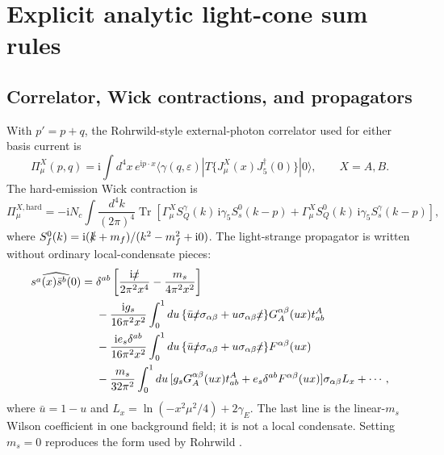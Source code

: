 \documentclass[11pt]{article}
\newcommand{\ii}{\mathrm{i}}
\begin{document}
\appendix

\section{Explicit analytic light-cone sum rules}
\label{app:lcsr}

\subsection{Correlator, Wick contractions, and propagators}

With $p'=p+q$, the Rohrwild-style external-photon correlator used for either
basis current is
\begin{equation}
 \Pi_\mu^X(p,q)=\ii\int d^4x\,e^{\ii p\cdot x}
 \langle\gamma(q,\varepsilon)|
 T\{J_\mu^X(x)J_5^\dagger(0)\}|0\rangle,\qquad X=A,B .
 \label{eq:app-correlator}
\end{equation}
The hard-emission Wick contraction is
\begin{equation}
 \Pi_{\mu}^{X,\mathrm{hard}}
 =-\ii N_c\!\int\!\frac{d^4k}{(2\pi)^4}
 \operatorname{Tr}\!\left[
 \Gamma_\mu^X S_Q^\gamma(k)\,\ii\gamma_5 S_s^0(k-p)
 +\Gamma_\mu^X S_Q^0(k)\,\ii\gamma_5 S_s^\gamma(k-p)
 \right],
 \label{eq:app-wick}
\end{equation}
where $S_f^0(k)=\ii(\slashed{k}+m_f)/(k^2-m_f^2+\ii0)$.
The light-strange propagator is written without ordinary local-condensate
pieces:
\begin{align}
 \widehat{s^a(x)\bar s^b(0)}={}&
 \delta^{ab}\left[\frac{\ii\slashed{x}}{2\pi^2x^4}
 -\frac{m_s}{4\pi^2x^2}\right]\nonumber\\
 &-\frac{\ii g_s}{16\pi^2x^2}\int_0^1du\,
 \{\bar u\slashed{x}\sigma_{\alpha\beta}
 +u\sigma_{\alpha\beta}\slashed{x}\}
 G_A^{\alpha\beta}(ux)t^A_{ab}\nonumber\\
 &-\frac{\ii e_s\delta^{ab}}{16\pi^2x^2}\int_0^1du\,
 \{\bar u\slashed{x}\sigma_{\alpha\beta}
 +u\sigma_{\alpha\beta}\slashed{x}\}
 F^{\alpha\beta}(ux)\nonumber\\
 &-\frac{m_s}{32\pi^2}\int_0^1du\,
 [g_sG_A^{\alpha\beta}(ux)t^A_{ab}
 +e_s\delta^{ab}F^{\alpha\beta}(ux)]
 \sigma_{\alpha\beta}L_x+\cdots ,
 \label{eq:app-light-propagator}
\end{align}
where $\bar u=1-u$ and
$L_x=\ln(-x^2\mu^2/4)+2\gamma_E$.  The last line is the linear-$m_s$ Wilson
coefficient in one background field; it is not a local condensate.  Setting
$m_s=0$ reproduces the form used by Rohrwild \cite{Rohrwild2007}.
\end{document}

